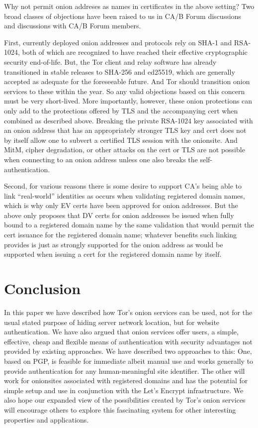\documentclass[10pt, conference, compsocconf]{styles/IEEEtran}
\begin{document}
Why not permit onion addreses as names in certificates in the above
setting? Two broad classes of objections have been raised to us in
CA/B Forum discussions and discussions with CA/B Forum members.

First, currently deployed onion addresses and protocols rely on SHA-1
and RSA-1024, both of which are recognized to have reached their
effective cryptographic security end-of-life. But, the Tor
client and relay software has already transitioned in stable releases
to SHA-256 and ed25519, which are generally accepted as adequate for
the foreseeable future. And Tor should transition onion services to
these within the year. So any valid objections based on this concern
must be very short-lived.  More importantly, however, these onion
protections can only add to the protections offered by TLS and the
accompanying cert when combined as described above. Breaking the
private RSA-1024 key associated with an onion address that has an
appropriately stronger TLS key and cert does not by itself allow one
to subvert a certified TLS session with the onionsite. And MitM,
cipher degradation, or other attacks on the cert or TLS are not
possible when connecting to an onion address unless one also breaks
the self-authentication.

Second, for various reasons there is some desire to support CA's being
able to link ``real-world'' identities as occurs when validating
registered domain names, which is why only EV certs have been approved
for onion addresses. But the above only proposes that DV certs for
onion addresses be issued when fully bound to a registered domain name
by the same validation that would permit the cert issuance for the
registered domain name; whatever benefits such linking provides is
just as strongly supported for the onion address as would be supported
when issuing a cert for the registered domain name by itself.

\section{Conclusion}

In this paper we have described how Tor's onion services can be used,
not for the usual stated purpose of hiding server network location,
but for website authentication.  We have also argued that onion
services offer users, a simple, effective, cheap and flexible means of
authentication with security advantages not provided by existing
approaches. We have described two approaches to this: One, based on
PGP, is feasible for immediate albeit manual use and works generally
to provide authentication for any human-meaningful site identifier. 
The other will work for onionsites associated with registered domains
and has the potential for simple setup and use in conjunction with the
Let's Encrypt infrastructure.  We also hope our expanded view of the
possibilities created by Tor's onion services will encourage others to
explore this fascinating system for other interesting properties and
applications.
\end{document}
